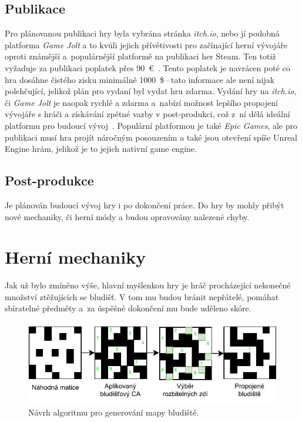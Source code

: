 \subsection*{Publikace}
Pro plánovanou publikaci hry byla vybrána stránka \textit{itch.io}, nebo jí podobná platforma \textit{Game Jolt} a to kvůli jejich přívětivosti pro začínající herní vývojáře oproti známější a~populárnější platformě na publikaci her Steam. Ten totiž vyžaduje za publikaci poplatek přes 90~€~\cite{Steam_submission}. Tento poplatek je navrácen poté co hra dosáhne čistého zisku minimálně 1000~\$\,--\,tato informace ale není nijak polehčující, jelikož plán pro vydaní byl vydat hru zdarma. Vydání hry na \textit{itch.io}, či \textit{Game Jolt} je naopak rychlé a zdarma a~nabízí možnost lepšího propojení vývojáře s hráči a získávání zpětné vazby v post-produkci, což z~ní dělá ideální platformu pro budoucí vývoj~\cite{GDevelop}. Populární platformou je také \textit{Epic Games}, ale pro publikaci musí hra projít náročným posouzením a také jsou otevření spíše Unreal Engine hrám, jelikož je to jejich nativní game engine.

\subsection*{Post-produkce}
Je plánován budoucí vývoj hry i po dokončení práce. Do hry by mohly přibýt nové mechaniky, či herní módy a budou opravovány nalezené chyby.

\section{Herní mechaniky}\label{chap:Herní mechaniky}
Jak už bylo zmíněno výše, hlavní myšlenkou hry je hráč procházející nekonečné množství ztěžujících se bludišť. V tom mu budou bránit nepřátelé, pomáhat sbíratelné předměty a~za úspěšné dokončení mu bude uděleno skóre.

\begin{figure}[h]
    \centering
    \includegraphics[width=\textwidth]{obrazky-figures/ch3/algoritmus_generovani_mapy.pdf}
    \caption{Návrh algoritmu pro generování mapy bludiště.}
    \label{fig:algoritmus_generovani_mapy}
\end{figure}

